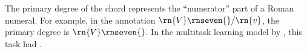 
The primary degree of the chord represents the ``numerator''
part of a Roman numeral. For example, in the annotation
$\rn{V}\rnseven{}/\rn{v}$, the primary degree is
$\rn{V}\rnseven{}$. In the multitask learning model by
\textcite{chen2018functional}, this task had .
